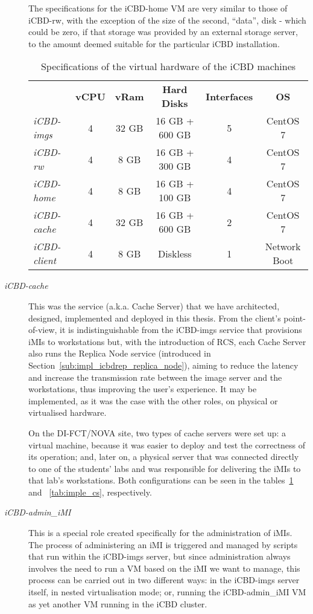 \begin{description}
	The specifications for the iCBD-home VM are very similar to those of iCBD-rw, with the exception of the size of the second, “data”, disk - which could be zero, if that storage was provided by an external storage server, to the amount deemed suitable for the particular iCBD installation.
	\begin{table}[]
\centering
\begin{tabular}{lccccc}
 & \textbf{vCPU} & \textbf{vRam} & \textbf{Hard Disks} & \textbf{Interfaces} & \textbf{OS} \\ \cline{2-6} 
\textit{iCBD-imgs} & 4 & 32 GB & 16 GB + 600 GB & 5 & CentOS 7 \\
\textit{iCBD-rw} & 4 & 8 GB & 16 GB + 300 GB & 4 & CentOS 7 \\
\textit{iCBD-home} & 4 & 8 GB & 16 GB + 100 GB & 4 & CentOS 7 \\
\textit{iCBD-cache} & 4 & 32 GB & 16 GB + 600 GB & 2 & CentOS 7 \\
\textit{iCBD-client} & 4 & 8 GB & Diskless & 1 & Network Boot
\end{tabular}
\caption{Specifications of the virtual hardware of the iCBD machines}
\label{tab:impl_VM_Specs}
\end{table}

	\item [\textit{iCBD-cache}] This was the service (a.k.a. Cache Server) that we have architected, designed, implemented and deployed in this thesis. From the client’s point-of-view, it is indistinguishable from the iCBD-imgs service that provisions iMIs to workstations but, with the introduction of RCS, each Cache Server also runs the Replica Node service (introduced in Section~\ref{sub:impl_icbdrep_replica_node}), aiming to reduce the latency and increase the transmission rate between the image server and the workstations, thus improving the user’s experience. It may be implemented, as it was the case with the other roles, on physical or virtualised hardware. 

	On the DI-FCT/NOVA site, two types of cache servers were set up: a virtual machine, because it was easier to deploy and test the correctness of its operation; and, later on, a physical server that was connected directly to one of the students’ labs and was responsible for delivering the iMIs to that lab’s workstations. Both configurations can be seen in the tables~\ref{tab:impl_VM_Specs} and ~\ref{tab:imple_cs}, respectively.
	\item [\textit{iCBD-admin\_iMI}] This is a special role created specifically for the administration of iMIs. The process of administering an iMI is triggered and managed by scripts that run within the iCBD-imgs server, but since administration always involves the need to run a VM based on the iMI we want to manage, this process can be carried out in two different ways: in the iCBD-imgs server itself, in nested virtualisation mode; or, running the iCBD-admin\_iMI VM as yet another VM running in the iCBD cluster.
	

\end{description}
